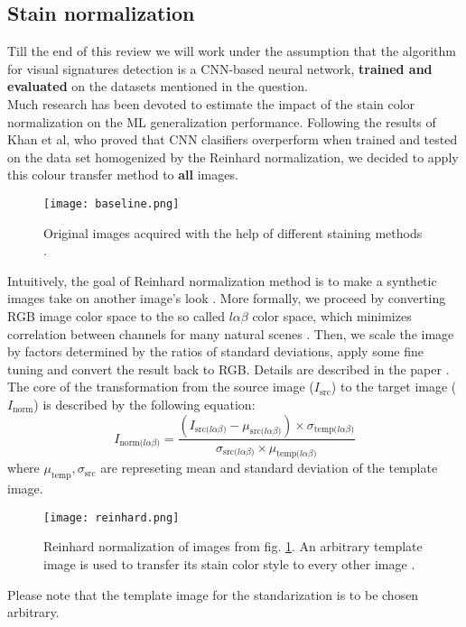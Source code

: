 \documentclass[11pt]{article}
\begin{document}
\subsection{Stain normalization}
Till the end of this review we will work under the assumption that the algorithm for visual signatures detection is a CNN-based neural network, \textbf{trained and evaluated} on the datasets mentioned in the question.
\\ Much research has been devoted to estimate the impact of the stain color normalization on the ML generalization performance. Following the results of Khan et al, who proved that CNN clasifiers overperform when 
trained and tested on the data set homogenized by the Reinhard normalization, we decided to apply this colour transfer method to \textbf{all} images.
\begin{figure}[H]
\centering
\texttt{[image: baseline.png]}
				\caption{Original images acquired with the help of different staining methods \cite{khan}.}
\label{fig:baseline}
\end{figure}

Intuitively, the goal of Reinhard normalization method is to make a synthetic images take on another image's look \cite{reinhard}. More formally, we proceed by converting RGB image color space to 
the so called $l \alpha \beta$ color space, which minimizes correlation between channels for many natural scenes \cite{reinhard}. Then, we scale the image by factors determined by the 
ratios of standard deviations, apply some fine tuning and convert the result back to RGB. Details are described in the paper \cite{reinhard}.
The core of the transformation from the source image ($I_{\text{src}}$) to the target image ($I_{\text{norm}}$) is described by the following equation:
\[
I_{\text{norm($l \alpha \beta$})} = 
\frac{(I_{\text{src($l \alpha \beta$)}} - \mu_{\text{src($l \alpha \beta$)}}) \times \sigma_{\text{temp($l \alpha \beta$)}}}
{\sigma_{\text{src($l \alpha \beta$)}} \times \mu_{\text{temp($l \alpha \beta$)}}}
\]
where $\mu_{\text{temp}}, \sigma_{\text{src}}$ are represeting mean and standard deviation of the template image.
\begin{figure}[H]
\centering
\texttt{[image: reinhard.png]}
				\caption{Reinhard normalization of images from fig. \ref{fig:baseline}. An arbitrary template image is used to transfer its stain color style to every other image \cite{khan}.}			
\end{figure}
Please note that the template image for the standarization is to be chosen arbitrary. 	
\end{document}
